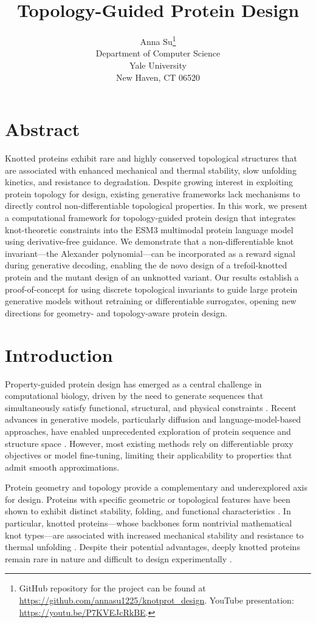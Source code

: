 \documentclass{article}
\title{Topology-Guided Protein Design}
\author{
  Anna Su\thanks{GitHub repository for the project can be found at \url{https://github.com/annasu1225/knotprot_design}. YouTube presentation: \url{https://youtu.be/P7KVEJcRkBE}.} \\
  Department of Computer Science\\
  Yale University\\
  New Haven, CT 06520 \\
}
\begin{document}
\maketitle

\section{Abstract}

Knotted proteins exhibit rare and highly conserved topological structures that are associated with enhanced mechanical and thermal stability, slow unfolding kinetics, and resistance to degradation.
Despite growing interest in exploiting protein topology for design, existing generative frameworks lack mechanisms to directly control non-differentiable topological properties.
In this work, we present a computational framework for topology-guided protein design that integrates knot-theoretic constraints into the ESM3 multimodal protein language model using derivative-free guidance.
We demonstrate that a non-differentiable knot invariant—the Alexander polynomial—can be incorporated as a reward signal during generative decoding, enabling the de novo design of a trefoil-knotted protein and the mutant design of an unknotted variant.
Our results establish a proof-of-concept for using discrete topological invariants to guide large protein generative models without retraining or differentiable surrogates, opening new directions for geometry- and topology-aware protein design.

\section{Introduction}

Property-guided protein design has emerged as a central challenge in computational biology, driven by the need to generate sequences that simultaneously satisfy functional, structural, and physical constraints \cite{Tagasovska2022,Hong2024,Luo2025}.
Recent advances in generative models, particularly diffusion and language-model-based approaches, have enabled unprecedented exploration of protein sequence and structure space \cite{Hayes2025}.
However, most existing methods rely on differentiable proxy objectives or model fine-tuning, limiting their applicability to properties that admit smooth approximations.

Protein geometry and topology provide a complementary and underexplored axis for design.
Proteins with specific geometric or topological features have been shown to exhibit distinct stability, folding, and functional characteristics \cite{Sukowska2008,Hsu2024,Madsen2025}.
In particular, knotted proteins—whose backbones form nontrivial mathematical knot types—are associated with increased mechanical stability and resistance to thermal unfolding \cite{Sukowska2012,Faisca2015,Lim2015}.
Despite their potential advantages, deeply knotted proteins remain rare in nature and difficult to design experimentally \cite{King2010,Doyle2023}.
\end{document}
